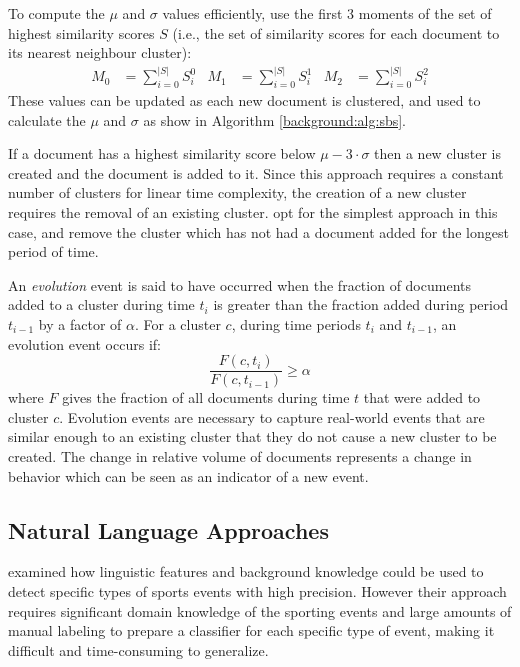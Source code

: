 To compute the $\mu$ and $\sigma$ values efficiently, \cite{Aggarwal12} use the first 3 moments of the set of highest similarity scores $S$ (i.e., the set of  similarity scores for each document to its nearest neighbour cluster):
\begin{align*}
	M_0 &= \sum_{i = 0}^{|S|}{S_i^0} & M_1 &= \sum_{i = 0}^{|S|}{S_i^1} & M_2 &= \sum_{i = 0}^{|S|}{S_{i}^2}
\end{align*}
These values can be updated as each new document is clustered, and used to calculate the $\mu$ and $\sigma$ as show in Algorithm \ref{background:alg:sbs}.

If a document has a highest similarity score below $\mu - 3 \cdot \sigma$ then a new cluster is created and the document is added to it.
Since this approach requires a constant number of clusters for linear time complexity, the creation of a new cluster requires the removal of an existing cluster.
\cite{Aggarwal12} opt for the simplest approach in this case, and remove the cluster which has not had a document added for the longest period of time.

An \emph{evolution} event is said to have occurred when the fraction of documents added to a cluster during time $t_{i}$ is greater than the fraction added during period $t_{i-1}$ by a factor of $\alpha$.
For a cluster $c$, during time periods $t_i$ and $t_{i-1}$, an evolution event occurs if:
\begin{displaymath}
	\frac{F(c, t_i)}{F(c, t_{i-1})} \geq \alpha
\end{displaymath}
where $F$ gives the fraction of all documents during time $t$ that were added to cluster $c$.
Evolution events are necessary to capture real-world events that are similar enough to an existing cluster that they do not cause a new cluster to be created.
The change in relative volume of documents represents a change in behavior which can be seen as an indicator of a new event.

\subsection{Natural Language Approaches}
\cite{Choudhury11extractingsemantic} examined how linguistic features and  background knowledge could be used to detect specific types of sports events with high precision. However their approach requires significant domain knowledge of the sporting events and large amounts of manual labeling to prepare a classifier for each specific type of event, making it difficult and time-consuming to generalize.

